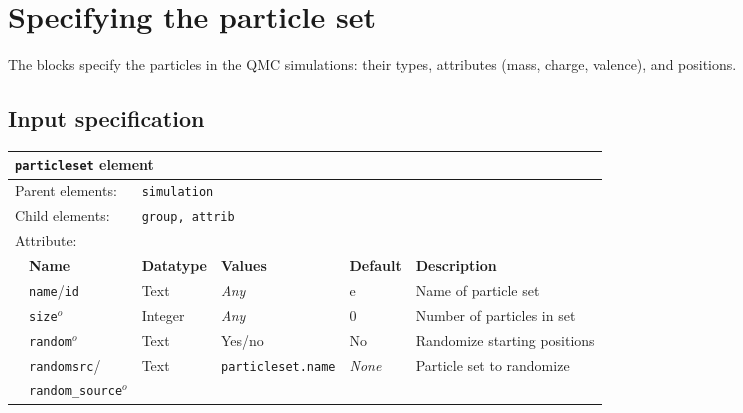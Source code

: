 \section{Specifying the particle set}
\label{sec:particleset}


The  blocks specify the particles in the QMC simulations: their types, attributes (mass, charge, valence), and positions.   

\subsection{Input specification}
\begin{table}[h]
\begin{center}
\begin{tabularx}{\textwidth}{l l l l l X }
\hline
\multicolumn{6}{l}{\texttt{particleset} element} \\
\hline
\multicolumn{2}{l}{Parent elements:} & \multicolumn{4}{l}{\texttt{simulation}}\\
\multicolumn{2}{l}{Child  elements:} & \multicolumn{4}{l}{\texttt{group, attrib}}\\
\multicolumn{2}{l}{Attribute:} & \multicolumn{4}{l}{}\\
   &   \bfseries Name            & \bfseries Datatype & \bfseries Values & \bfseries Default   & \bfseries Description \\
   &   \texttt{name}/\texttt{id}   &  Text              &  \textit{Any}    &  e                & Name of particle set  \\
   &   \texttt{size}$^o$           &  Integer           &  \textit{Any}    &  0                & Number of particles in set \\
   &   \texttt{random}$^o$         &  Text              &  Yes/no          &  No               & Randomize starting positions \\
   &   \texttt{randomsrc}/         &  Text     & \texttt{particleset.name} & \textit{None}     & Particle set to randomize  \\
   &   \texttt{random\_source}$^o$ &                    &                  &                   &                       \\
  \hline
\end{tabularx}
\end{center}
\end{table}

